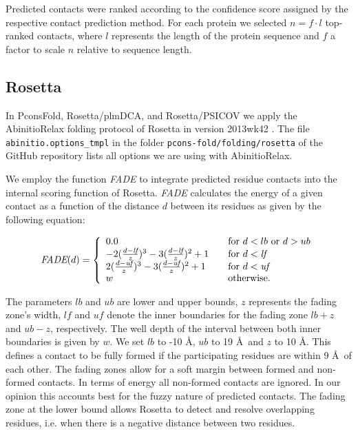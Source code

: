 \documentclass{bioinfo}
\begin{document}
\begin{methods}
Predicted contacts were ranked according to the confidence score
assigned by the respective contact prediction method. For each protein
we selected $n = f \cdot l$ top-ranked contacts, where $l$ represents
the length of the protein sequence and $f$ a factor to scale $n$
relative to sequence length.



\subsection{Rosetta}
In PconsFold, Rosetta/plmDCA, and Rosetta/PSICOV we apply the
AbinitioRelax folding protocol \cite[]{rohl_protein_2004} of Rosetta
in version 2013wk42 \cite[]{leaver-fay_rosetta3:_2011}. The file {\tt
 abinitio.options\_tmpl} in the folder {\tt pcons-fold/folding/rosetta} of the GitHub
repository lists all options we are using with AbinitioRelax. 

We employ the function \emph{FADE} to integrate predicted residue
contacts into the internal scoring function of Rosetta. \emph{FADE}
calculates the energy of a given contact as a function of the distance
$d$ between its residues as given by the following equation:

\begin{equation}%
\textit{FADE}(d) = \left\{
\begin{array}{l l l}\label{eq:fade}
0.0 & \quad \textrm{for $d < lb$ or $d > ub$} \\
-2(\frac{d - \textit{lf}}{z})^3 - 3(\frac{d - \textit{lf}}{z})^2 + 1 & \quad \textrm{for $d < \textit{lf}$} \\
2(\frac{d - \textit{uf}}{z})^3 - 3(\frac{d - \textit{uf}}{z})^2 + 1 & \quad \textrm{for $d < \textit{uf}$} \\
w & \quad \textrm{otherwise.} \\
\end{array} \right.
\end{equation}

The parameters $lb$ and $ub$ are lower and upper bounds, $z$
represents the fading zone's width, $\textit{lf}$ and $\textit{uf}$
denote the inner boundaries for the fading zone $lb + z$ and $ub - z$,
respectively. The well depth of the interval between both inner
boundaries is given by $w$. We set $lb$ to -10 \AA, $ub$ to 19 \AA\
and $z$ to 10 \AA. This defines a contact to be fully formed if the
participating residues are within 9 \AA\ of each other. The fading
zones allow for a soft margin between formed and non-formed
contacts. In terms of energy all non-formed contacts are ignored. In
our opinion this accounts best for the fuzzy nature of predicted
contacts. The fading zone at the lower bound allows Rosetta to detect
and resolve overlapping residues, i.e. when there is a negative
distance between two residues. 



\end{methods}
\end{document}
